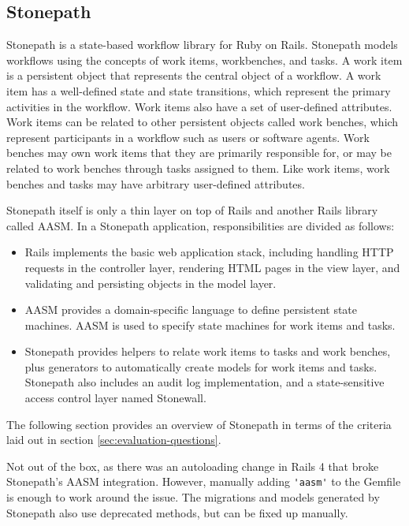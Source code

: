 \subsection {Stonepath}

Stonepath is a state-based workflow library for Ruby on Rails. Stonepath models workflows using the concepts of work items, workbenches, and tasks. A work item is a persistent object that represents the central object of a workflow. A work item has a well-defined state and state transitions, which represent the primary activities in the workflow. Work items also have a set of user-defined attributes. Work items can be related to other persistent objects called work benches, which represent participants in a workflow such as users or software agents. Work benches may own work items that they are primarily responsible for, or may be related to work benches through tasks assigned to them. Like work items, work benches and tasks may have arbitrary user-defined attributes.

Stonepath itself is only a thin layer on top of Rails and another Rails library called AASM. In a Stonepath application, responsibilities are divided as follows:

\begin{itemize}
\item Rails implements the basic web application stack, including handling HTTP requests in the controller layer, rendering HTML pages in the view layer, and validating and persisting objects in the model layer.
\item AASM provides a domain-specific language to define persistent state machines. AASM is used to specify state machines for work items and tasks.
\item Stonepath provides helpers to relate work items to tasks and work benches, plus generators to automatically create models for work items and tasks. Stonepath also includes an audit log implementation, and a state-sensitive access control layer named Stonewall.
\end{itemize}

The following section provides an overview of Stonepath in terms of the criteria laid out in section \ref{sec:evaluation-questions}.



Not out of the box, as there was an autoloading change in Rails 4 that broke Stonepath’s AASM integration. However, manually adding \verb!'aasm'! to the Gemfile is enough to work around the issue. The migrations and models generated by Stonepath also use deprecated methods, but can be fixed up manually.


